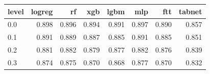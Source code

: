 \begin{tabular}{lrrrrrrr}
\toprule
level & logreg & rf & xgb & lgbm & mlp & ftt & tabnet \\
\midrule
0.0 & 0.898 & 0.896 & 0.894 & 0.891 & 0.897 & 0.890 & 0.857 \\
0.1 & 0.891 & 0.889 & 0.887 & 0.885 & 0.891 & 0.885 & 0.851 \\
0.2 & 0.881 & 0.882 & 0.879 & 0.877 & 0.882 & 0.876 & 0.839 \\
0.3 & 0.874 & 0.875 & 0.870 & 0.868 & 0.877 & 0.870 & 0.832 \\
\bottomrule
\end{tabular}
